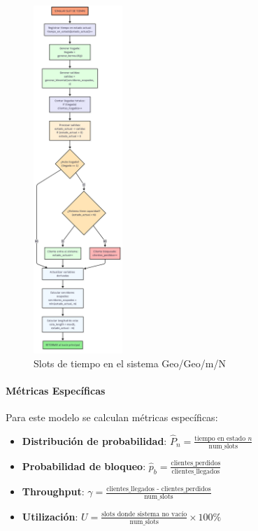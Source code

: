 \documentclass{article}
\begin{document}
\begin{figure}[H]
    \centering
    \includegraphics[width=0.3\textwidth]{images/flujos/GeoSlot.png}
    \caption{Slots de tiempo en el sistema Geo/Geo/m/N}
    \label{fig:geo_geo_slots}
\end{figure}
\paragraph{Métricas Específicas}

Para este modelo se calculan métricas específicas:

\begin{itemize}
    \item \textbf{Distribución de probabilidad}: $\hat{P}_n = \frac{\text{tiempo en estado } n}{\text{num\_slots}}$
    \item \textbf{Probabilidad de bloqueo}: $\hat{p}_b = \frac{\text{clientes\_perdidos}}{\text{clientes\_llegados}}$
    \item \textbf{Throughput}: $\gamma = \frac{\text{clientes\_llegados - clientes\_perdidos}}{\text{num\_slots}}$
    \item \textbf{Utilización}: $U = \frac{\text{slots donde sistema no vacío}}{\text{num\_slots}} \times 100\%$
\end{itemize}
\end{document}

